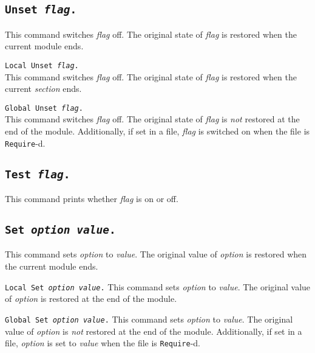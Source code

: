\subsection[\tt Unset {\rm\sl flag}.]{\tt Unset {\rm\sl flag}.}
This command switches {\rm\sl flag} off. The original state of {\rm\sl flag}
is restored when the current module ends.

\begin{Variants}
\item {\tt Local Unset {\rm\sl flag}.}\\
This command switches {\rm\sl flag} off. The original state of {\rm\sl flag}
is restored when the current \emph{section} ends.
\item {\tt Global Unset {\rm\sl flag}.}\\
This command switches {\rm\sl flag} off.  The original state of
{\rm\sl flag} is \emph{not} restored at the end of the module. Additionally,
if set in a file, {\rm\sl flag} is switched on when the file is
{\tt Require}-d.
\end{Variants}

\subsection[\tt Test {\rm\sl flag}.]{\tt Test {\rm\sl flag}.}
This command prints whether {\rm\sl flag} is on or off.

\subsection[\tt Set {\rm\sl option} {\rm\sl value}.]{\tt Set {\rm\sl option} {\rm\sl value}.}
This command sets {\rm\sl option} to {\rm\sl value}. The original value of
{\rm\sl option} is restored when the current module ends.

\begin{Variants}
\item {\tt Local Set {\rm\sl option} {\rm\sl value}.}
This command sets {\rm\sl option} to {\rm\sl value}. The original value of
{\rm\sl option} is restored at the end of the module.
\item {\tt Global Set {\rm\sl option} {\rm\sl value}.}
This command sets {\rm\sl option} to {\rm\sl value}. The original value of
{\rm\sl option} is \emph{not} restored at the end of the module. Additionally,
if set in a file, {\rm\sl option} is set to {\rm\sl value} when the file is
{\tt Require}-d.
\end{Variants}

